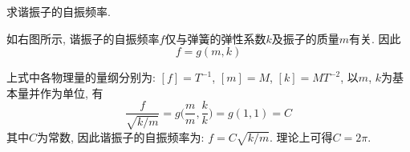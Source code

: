 \begin{problem}[05]
求谐振子的自振频率.
\end{problem}
\begin{solution}
\begin{minipage}[c]{0.8\linewidth}
如右图所示, 谐振子的自振频率$f$仅与弹簧的弹性系数$k$及振子的质量$m$有关. 因此
\[
f = g(m,k)
\]
\end{minipage}
\begin{minipage}[c]{0.2\linewidth}
\begin{center}

\end{center}
\end{minipage}
上式中各物理量的量纲分别为: $[f] = T^{-1}$, $[m]=M$, $[k] = MT^{-2}$, 以$m$, $k$为基本量并作为单位, 有
\[
\frac{f}{\sqrt{k/m}} = g\bigg(\frac{m}{m},\frac{k}{k}\bigg) = g(1,1) = C
\]
其中$C$为常数, 因此谐振子的自振频率为: $f = C\sqrt{k/m}$. 理论上可得$C=2\pi$.
\end{solution}
